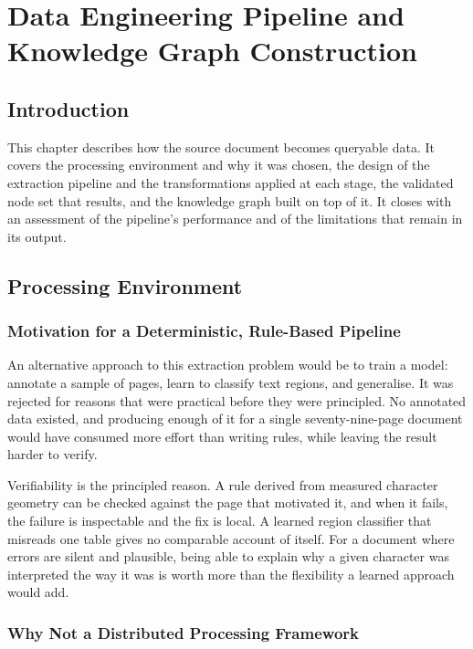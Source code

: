 \chapter{Data Engineering Pipeline and Knowledge Graph Construction}

\section*{Introduction}

This chapter describes how the source document becomes queryable data. It covers the processing environment and why it was chosen, the design of the extraction pipeline and the transformations applied at each stage, the validated node set that results, and the knowledge graph built on top of it. It closes with an assessment of the pipeline's performance and of the limitations that remain in its output.

\section{Processing Environment}

\subsection{Motivation for a Deterministic, Rule-Based Pipeline}

An alternative approach to this extraction problem would be to train a model: annotate a sample of pages, learn to classify text regions, and generalise. It was rejected for reasons that were practical before they were principled. No annotated data existed, and producing enough of it for a single seventy-nine-page document would have consumed more effort than writing rules, while leaving the result harder to verify.

Verifiability is the principled reason. A rule derived from measured character geometry can be checked against the page that motivated it, and when it fails, the failure is inspectable and the fix is local. A learned region classifier that misreads one table gives no comparable account of itself. For a document where errors are silent and plausible, being able to explain why a given character was interpreted the way it was is worth more than the flexibility a learned approach would add.

\subsection{Why Not a Distributed Processing Framework}

